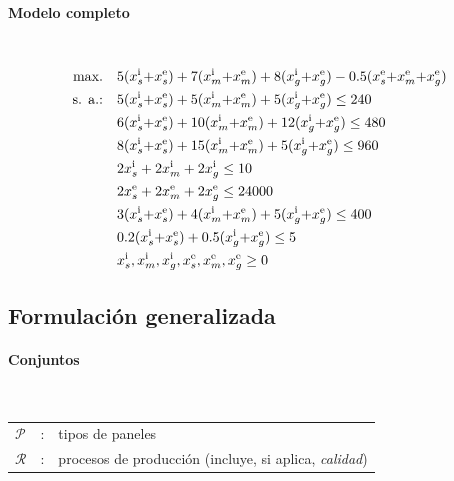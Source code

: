 \paragraph{Modelo completo}\mbox{}\\
\begin{align}
\mbox{max.}\quad 
& 5(x_s^{\mathrm{i}}{+}x_s^{\mathrm{e}}) + 7(x_m^{\mathrm{i}}{+}x_m^{\mathrm{e}}) + 8(x_g^{\mathrm{i}}{+}x_g^{\mathrm{e}})
 - 0.5(x_s^{\mathrm{e}}{+}x_m^{\mathrm{e}}{+}x_g^{\mathrm{e}}) \notag\\
\mbox{s. a.:}\quad
& 5(x_s^{\mathrm{i}}{+}x_s^{\mathrm{e}}) + 5(x_m^{\mathrm{i}}{+}x_m^{\mathrm{e}}) + 5(x_g^{\mathrm{i}}{+}x_g^{\mathrm{e}}) \le 240 \notag\\
& 6(x_s^{\mathrm{i}}{+}x_s^{\mathrm{e}}) + 10(x_m^{\mathrm{i}}{+}x_m^{\mathrm{e}}) + 12(x_g^{\mathrm{i}}{+}x_g^{\mathrm{e}}) \le 480 \notag\\
& 8(x_s^{\mathrm{i}}{+}x_s^{\mathrm{e}}) + 15(x_m^{\mathrm{i}}{+}x_m^{\mathrm{e}}) + 5(x_g^{\mathrm{i}}{+}x_g^{\mathrm{e}}) \le 960 \notag\\
& 2x_s^{\mathrm{i}} + 2x_m^{\mathrm{i}} + 2x_g^{\mathrm{i}} \le 10 \notag\\
& 2x_s^{\mathrm{e}} + 2x_m^{\mathrm{e}} + 2x_g^{\mathrm{e}} \le 24000 \notag\\
& 3(x_s^{\mathrm{i}}{+}x_s^{\mathrm{e}}) + 4(x_m^{\mathrm{i}}{+}x_m^{\mathrm{e}}) + 5(x_g^{\mathrm{i}}{+}x_g^{\mathrm{e}}) \le 400 \notag\\
& 0.2(x_s^{\mathrm{i}}{+}x_s^{\mathrm{e}}) + 0.5(x_g^{\mathrm{i}}{+}x_g^{\mathrm{e}}) \le 5 \notag\\
& x_s^{\mathrm{i}},x_m^{\mathrm{i}},x_g^{\mathrm{i}},x_s^{\mathrm{e}},x_m^{\mathrm{e}},x_g^{\mathrm{e}} \ge 0 \notag
\end{align}


\subsection{Formulación generalizada}

\paragraph{Conjuntos}\mbox{}\\
\begin{tabular}{l c l}
    $\mathcal{P}$ & : & tipos de paneles \\
    $\mathcal{R}$ & : & procesos de producción (incluye, si aplica, \emph{calidad}) \\
\end{tabular}
\\[0.25cm]

